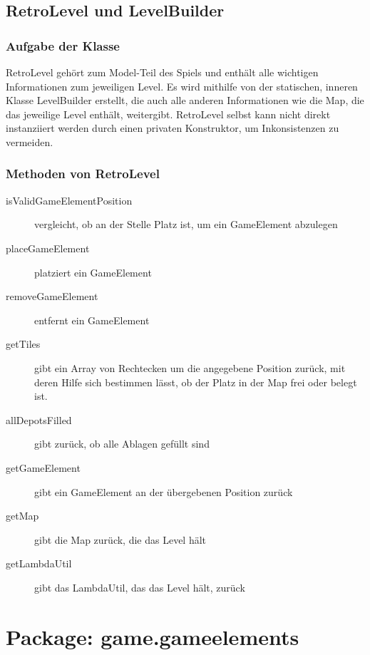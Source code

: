 \documentclass[parskip=full]{scrreprt}
\begin{document}
\subsection{RetroLevel und LevelBuilder}

\subsubsection{Aufgabe der Klasse}

\begin{description}
	\item RetroLevel gehört zum Model-Teil des Spiels und enthält alle wichtigen Informationen zum jeweiligen Level. Es wird mithilfe von der statischen, inneren Klasse LevelBuilder erstellt, die auch alle anderen Informationen wie die Map, die das jeweilige Level enthält, weitergibt. RetroLevel selbst kann nicht direkt instanziiert werden durch einen privaten Konstruktor, um Inkonsistenzen zu vermeiden.
\end{description}

\subsubsection{Methoden von RetroLevel}

\begin{description}
	
	\item[isValidGameElementPosition] vergleicht, ob an der Stelle Platz ist, um ein GameElement abzulegen
	\item[placeGameElement] platziert ein GameElement
	\item[removeGameElement] entfernt ein GameElement
	\item[getTiles] gibt ein Array von Rechtecken um die angegebene Position zurück, mit deren Hilfe sich bestimmen lässt, ob der Platz in der Map frei oder belegt ist.
	\item[allDepotsFilled] gibt zurück, ob alle Ablagen gefüllt sind
	\item[getGameElement] gibt ein GameElement an der übergebenen Position zurück
	\item[getMap] gibt die Map zurück, die das Level hält
	\item[getLambdaUtil] gibt das LambdaUtil, das das Level hält, zurück
	
\end{description}

\section{Package: game.gameelements}
\end{document}
